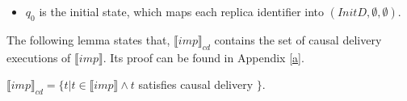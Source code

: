 \begin {itemize}
    Let us explain $< \otimes m$. $< \otimes m$ will change $<$ as follows:

    \begin{itemize}
    \setlength{\itemsep}{0.5pt}
    \item[-] $\forall k' \neq r$, if $(dat,r_1,k') \in msgs(k')$, then add $((dat,r_1,k'),k')$. 

    \end{itemize}

\item[-] $q_0$ is the initial state, which maps each replica identifier into $(InitD,\emptyset,\emptyset)$. 
\end{itemize}

The following lemma states that, $\llbracket imp \rrbracket_{cd}$ contains the set of causal delivery executions of $\llbracket imp \rrbracket$. Its proof can be found in Appendix \ref{a}. 

\begin{lemma}
\label{lemma:semantics of imp cd contains the set of causal delivery executions of semantics of imp}

$\llbracket imp \rrbracket_{cd} = \{ t \vert t \in \llbracket imp \rrbracket \wedge t$ satisfies causal delivery $\}$. 
\end{lemma}


